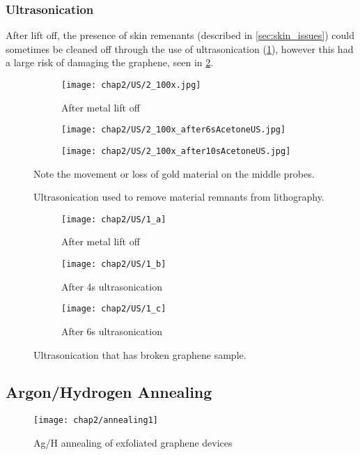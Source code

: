 \documentclass[../../Matt_Gebert_Honours_Thesis.tex]{subfiles}
\begin{document}
	\subsubsection{Ultrasonication}\label{sec:ultrasonication}
	After lift off, the presence of skin remenants (described in \cref{sec:skin_issues}) could sometimes be cleaned off through the use of ultrasonication (\cref{fig:lithography_skins_us}), however this had a large risk of damaging the graphene, seen in \cref{fig:lithography_skins_break}.
	
	\begin{figure}[H]
		\centering
		\begin{subfigure}[b]{0.3\textwidth}
			\texttt{[image: chap2/US/2\_100x.jpg]}
			\caption{After metal lift off}			
		\end{subfigure}
		\begin{subfigure}[b]{0.3\textwidth}
			\texttt{[image: chap2/US/2\_100x\_after6sAcetoneUS.jpg]}
		\end{subfigure}
		\begin{subfigure}[b]{0.3\textwidth}
			\texttt{[image: chap2/US/2\_100x\_after10sAcetoneUS.jpg]}
		\end{subfigure}
		\caption{Ultrasonication used to remove material remnants from lithography.}\label{fig:lithography_skins_us}Note the movement or loss of gold material on the middle probes.
	\end{figure}
	
	\begin{figure}[H]
		\centering
		\begin{subfigure}[b]{0.3\textwidth}
			\texttt{[image: chap2/US/1\_a]}
			\caption{After metal lift off}
		\end{subfigure}
		\begin{subfigure}[b]{0.3\textwidth}
			\texttt{[image: chap2/US/1\_b]}
			\caption{After 4s ultrasonication}
		\end{subfigure}
		\begin{subfigure}[b]{0.3\textwidth}
			\texttt{[image: chap2/US/1\_c]}
			\caption{After 6s ultrasonication}
		\end{subfigure}
		\caption{Ultrasonication that has broken graphene sample.}\label{fig:lithography_skins_break}
	\end{figure}

	\subsection{Argon/Hydrogen Annealing}\label{sec:annealing}
	\begin{wrapfigure}[9]{r}[0pt]{7cm}
		\vspace{-1.1cm}
		\centering
		\texttt{[image: chap2/annealing1]}
		\caption[Ag/H annealing]{Ag/H annealing of exfoliated graphene devices}
	\end{wrapfigure}
	
\end{document}
